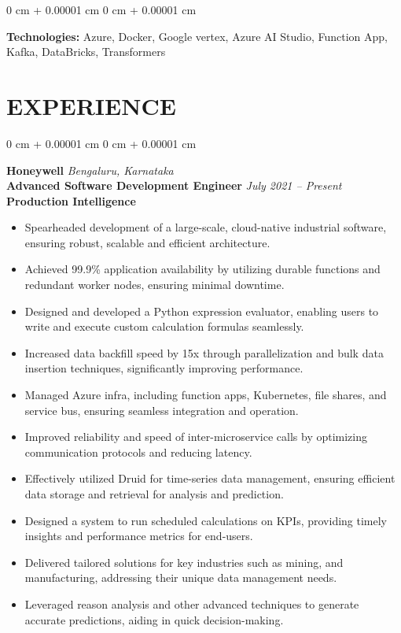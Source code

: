 \documentclass[10pt, letterpaper]{article}
\newenvironment{highlights}{
    \begin{itemize}[
        topsep=0.03 cm,
        parsep=0.02 cm,
        partopsep=0pt,
        itemsep=0pt,
        leftmargin=0 cm + 5pt
    ]
}{
    \end{itemize}
} %
\newenvironment{onecolentry}{
    \begin{adjustwidth}{
        0 cm + 0.00001 cm
    }{
        0 cm + 0.00001 cm
    }
}{
    \end{adjustwidth}
} %
\begin{document}
        \vspace{0.03 cm}

        \begin{onecolentry}
            \textbf{Technologies:} Azure, Docker, Google vertex, Azure AI Studio, Function App, Kafka, DataBricks, Transformers\end{onecolentry}

        

    \section{EXPERIENCE}

    
        \begin{onecolentry}
            \textbf{\large Honeywell} \hfill \textit{\textcolor{darkteal}{Bengaluru, Karnataka}} \\  
            \textbf{\normalsize Advanced Software Development Engineer} \hfill \textit{\textcolor{darkteal}{July 2021 – Present}} \\ %
            \textbf{Production Intelligence} \\  
            \begin{adjustwidth}{0.4cm}{0cm}
                \begin{highlights}
                    \item Spearheaded development of a large-scale, cloud-native industrial software, ensuring robust, scalable and efficient architecture.
                    \item Achieved 99.9\% application availability by utilizing durable functions and redundant worker nodes, ensuring minimal downtime.
                    \item Designed and developed a Python expression evaluator, enabling users to write and execute custom calculation formulas seamlessly.
                    \item Increased data backfill speed by 15x through parallelization and bulk data insertion techniques, significantly improving performance.
                    \item Managed Azure infra, including function apps, Kubernetes, file shares, and service bus, ensuring seamless integration and operation.
                    \item Improved reliability and speed of inter-microservice calls by optimizing communication protocols and reducing latency.
                    \item Effectively utilized Druid for time-series data management, ensuring efficient data storage and retrieval for analysis and prediction.
                    \item Designed a system to run scheduled calculations on KPIs, providing timely insights and performance metrics for end-users.
                    \item Delivered tailored solutions for key industries such as mining, and manufacturing, addressing their unique data management needs.
                    \item Leveraged reason analysis and other advanced techniques to generate accurate predictions, aiding in quick decision-making.
                    

\end{highlights}
\end{adjustwidth}
\end{onecolentry}
\end{document}
